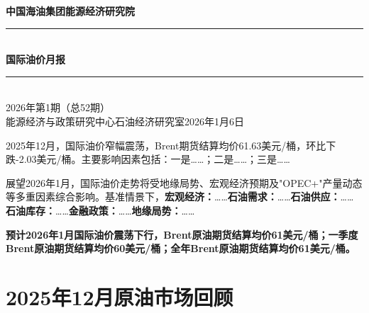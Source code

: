 \documentclass[12pt, a4paper]{article}
\newcommand{\ReportYear}{2026}              %
\newcommand{\ReportIssue}{1}                %
\newcommand{\ReportTotalIssue}{52}          %
\newcommand{\ReportDate}{2026年1月6日}      %
\newcommand{\ReviewMonth}{2025年12月}       %
\newcommand{\ForecastMonth}{2026年1月}      %
\newcommand{\BrentForecastMonth}{61}        %
\newcommand{\BrentForecastQ}{60}            %
\newcommand{\BrentForecastYear}{61}         %
\newcommand{\BrentAvgActual}{61.63}
\newcommand{\BrentMoMChg}{-2.03}
\begin{document}
\thispagestyle{plain}

\begin{center}
  {\bfseries{}\color{cnoocblue}
    中国海油集团能源经济研究院}\\[6pt]
  \rule{\linewidth}{2pt}\\[4pt]
  {\bfseries{}\color{cnoocblue}
    国际油价月报}\\[4pt]
  \rule{\linewidth}{0.5pt}\\[6pt]
  {
    \ReportYear{}年第\ReportIssue{}期（总\ReportTotalIssue{}期）}\\[4pt]
  {
    能源经济与政策研究中心石油经济研究室\hfill \ReportDate}
\end{center}

\vspace{12pt}

\begin{tcolorbox}[
  title={\bfseries\CJKfamily{zhsf}\color{white} 内容摘要},
  colback=white,
  colframe=cnoocblue,
  colbacktitle=cnoocblue,
  fonttitle=\bfseries,
  boxrule=0.8pt,
  arc=2pt,
  left=6pt, right=6pt, top=6pt, bottom=6pt
]
\ReviewMonth{}，国际油价窄幅震荡，Brent期货结算均价\BrentAvgActual{}美元/桶，环比下跌\BrentMoMChg{}美元/桶。主要影响因素包括：一是……；二是……；三是……

展望\ForecastMonth{}，国际油价走势将受地缘局势、宏观经济预期及"OPEC+"产量动态等多重因素综合影响。基准情景下，\textbf{宏观经济：}……\textbf{石油需求：}……\textbf{石油供应：}……\textbf{石油库存：}……\textbf{金融政策：}……\textbf{地缘局势：}……

\textbf{预计\ForecastMonth{}国际油价震荡下行，Brent原油期货结算均价\BrentForecastMonth{}美元/桶；一季度Brent原油期货结算均价\BrentForecastQ{}美元/桶；全年Brent原油期货结算均价\BrentForecastYear{}美元/桶。}
\end{tcolorbox}

\vspace{8pt}

\section{\ReviewMonth{}原油市场回顾}
\end{document}
